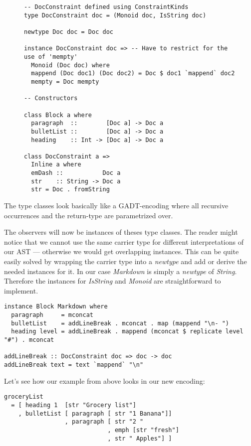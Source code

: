 \documentclass[format=acmsmall, review=true, screen=true, natbib=false]{acmart}
\begin{document}
\begin{figure}
\begin{lstlisting}
-- DocConstraint defined using ConstraintKinds
type DocConstraint doc = (Monoid doc, IsString doc)

newtype Doc doc = Doc doc

instance DocConstraint doc => -- Have to restrict for the use of 'mempty'
  Monoid (Doc doc) where
  mappend (Doc doc1) (Doc doc2) = Doc $ doc1 `mappend` doc2
  mempty = Doc mempty

-- Constructors

class Block a where
  paragraph  ::        [Doc a] -> Doc a
  bulletList ::        [Doc a] -> Doc a
  heading    :: Int -> [Doc a] -> Doc a

class DocConstraint a =>
  Inline a where
  emDash ::           Doc a
  str    :: String -> Doc a
  str = Doc . fromString
\end{lstlisting}
\end{figure}

The type classes look basically like a GADT-encoding where all recursive
occurrences and the return-type are parametrized over.

The observers will now be instances of theses type classes. The reader might
notice that we cannot use the same carrier type for different interpretations of
our AST — otherwise we would get overlapping instances. This can be quite easily
solved by wrapping the carrier type into a \emph{newtype} and add or derive the
needed instances for it. In our case \emph{Markdown} is simply a \emph{newtype} of
\emph{String}. Therefore the instances for \emph{IsString} and \emph{Monoid} are
straightforward to implement.

\begin{lstlisting}
instance Block Markdown where
  paragraph     = mconcat
  bulletList    = addLineBreak . mconcat . map (mappend "\n- ")
  heading level = addLineBreak . mappend (mconcat $ replicate level "#") . mconcat

addLineBreak :: DocConstraint doc => doc -> doc
addLineBreak text = text `mappend` "\n"
\end{lstlisting}

\clearpage

Let's see how our example from above looks in our new encoding:

\begin{lstlisting}
groceryList
  = [ heading 1  [str "Grocery list"]
    , bulletList [ paragraph [ str "1 Banana"]]
                 , paragraph [ str "2 "
                             , emph [str "fresh"]
                             , str " Apples"] ]
\end{lstlisting}
\end{document}
